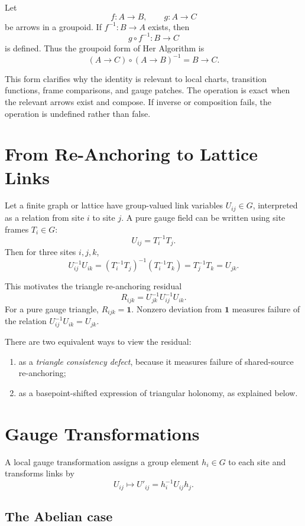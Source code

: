 \documentclass[11pt]{article}
\newcommand{\HA}{Her Algorithm}
\newcommand{\Id}{\mathbf{1}}
\newcommand{\Rijk}{R_{ijk}}
\begin{document}
Let
\[
f:A\to B,\qquad g:A\to C
\]
be arrows in a groupoid.  If \(f^{-1}:B\to A\) exists, then
\[
g\circ f^{-1}:B\to C
\]
is defined.  Thus the groupoid form of \HA{} is
\[
\boxed{(A\to C)\circ(A\to B)^{-1}=B\to C.}
\]

This form clarifies why the identity is relevant to local charts, transition functions, frame comparisons, and gauge patches.  The operation is exact when the relevant arrows exist and compose.  If inverse or composition fails, the operation is undefined rather than false.

\section{From Re-Anchoring to Lattice Links}

Let a finite graph or lattice have group-valued link variables \(U_{ij}\in G\), interpreted as a relation from site \(i\) to site \(j\).  A pure gauge field can be written using site frames \(T_i\in G\):
\[
U_{ij}=T_i^{-1}T_j.
\]
Then for three sites \(i,j,k\),
\[
U_{ij}^{-1}U_{ik}=(T_i^{-1}T_j)^{-1}(T_i^{-1}T_k)=T_j^{-1}T_k=U_{jk}.
\]

This motivates the triangle re-anchoring residual
\[
\Rijk=U_{jk}^{-1}U_{ij}^{-1}U_{ik}.
\]
For a pure gauge triangle, \(\Rijk=\Id\).  Nonzero deviation from \(\Id\) measures failure of the relation \(U_{ij}^{-1}U_{ik}=U_{jk}\).

There are two equivalent ways to view the residual:
\begin{enumerate}[leftmargin=1.5em]
\item as a \emph{triangle consistency defect}, because it measures failure of shared-source re-anchoring;
\item as a basepoint-shifted expression of triangular holonomy, as explained below.
\end{enumerate}

\section{Gauge Transformations}

A local gauge transformation assigns a group element \(h_i\in G\) to each site and transforms links by
\[
U_{ij}\mapsto U'_{ij}=h_i^{-1}U_{ij}h_j.
\]

\subsection{The Abelian case}
\end{document}
